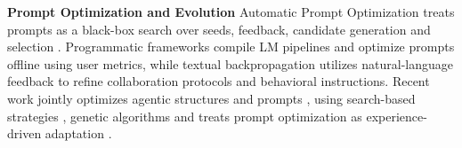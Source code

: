\vspace{-4pt}
\textbf{Prompt Optimization and Evolution} 
Automatic Prompt Optimization treats prompts as a black-box search over seeds, feedback, candidate generation and selection \citep{ramnath2025systematic}. 
Programmatic frameworks \citep{khattab2024dspy} compile LM pipelines and optimize prompts offline using user metrics, while textual backpropagation \citep{yuksekgonul2025optimizing, hu2024self, ma2025agentic} utilizes natural-language feedback to refine collaboration protocols and behavioral instructions. Recent work jointly optimizes agentic structures and prompts \citep{tian-etal-2025-agentinit, murthy2025promptomatix, spiess2025autopdl}, using search-based strategies \citep{zhang2024aflow}, genetic algorithms \citep{agrawal2025gepa} and treats prompt optimization as experience-driven adaptation \citep{yao2022react, shinn2023reflexion, zhao2024expel, pei2025scope, xie2026memo}.







